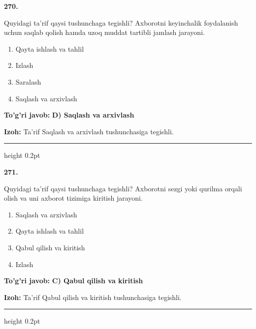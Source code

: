 \documentclass[10pt,a4paper,oneside]{article}
\begin{document}
\noindent\textbf{\color{ink}270.}
\par
Quyidagi ta'rif qaysi tushunchaga tegishli? Axborotni keyinchalik foydalanish uchun saqlab qolish hamda uzoq muddat tartibli jamlash jarayoni.
\begin{enumerate}[label=\Alph*),leftmargin=9mm]
\item Qayta ishlash va tahlil
\item Izlash
\item Saralash
\item Saqlash va arxivlash
\end{enumerate}
\begin{tcolorbox}[enhanced,breakable,colback=teal!4,colframe=teal!50!black,boxrule=0.5pt,arc=1.1mm,left=3mm,right=3mm,top=1.7mm,bottom=1.7mm,before skip=2mm,after skip=2mm]
\textbf{\color{teal}To'g'ri javob:} \textbf{D) Saqlash va arxivlash}
\par\smallskip
\textbf{Izoh:} Ta'rif Saqlash va arxivlash tushunchasiga tegishli.
\end{tcolorbox}
\vspace{2mm}\hrule height 0.2pt \vspace{3mm}

\noindent\textbf{\color{ink}271.}
\par
Quyidagi ta'rif qaysi tushunchaga tegishli? Axborotni sezgi yoki qurilma orqali olish va uni axborot tizimiga kiritish jarayoni.
\begin{enumerate}[label=\Alph*),leftmargin=9mm]
\item Saqlash va arxivlash
\item Qayta ishlash va tahlil
\item Qabul qilish va kiritish
\item Izlash
\end{enumerate}
\begin{tcolorbox}[enhanced,breakable,colback=teal!4,colframe=teal!50!black,boxrule=0.5pt,arc=1.1mm,left=3mm,right=3mm,top=1.7mm,bottom=1.7mm,before skip=2mm,after skip=2mm]
\textbf{\color{teal}To'g'ri javob:} \textbf{C) Qabul qilish va kiritish}
\par\smallskip
\textbf{Izoh:} Ta'rif Qabul qilish va kiritish tushunchasiga tegishli.
\end{tcolorbox}
\vspace{2mm}\hrule height 0.2pt \vspace{3mm}
\end{document}
